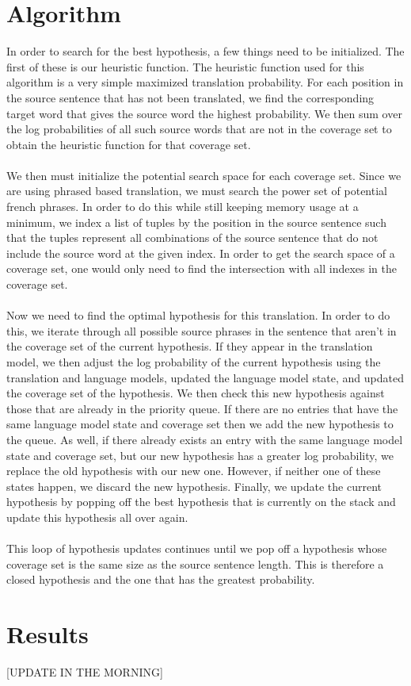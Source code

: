 \documentclass[11pt]{article}
\begin{document}
\section{Algorithm}
In order to search for the best hypothesis, a few things need to be initialized. The first of these is our heuristic function. The heuristic function used for this algorithm is a very simple maximized translation probability. For each position in the source sentence that has not been translated, we find the corresponding target word that gives the source word the highest probability. We then sum over the log probabilities of all such source words that are not in the coverage set to obtain the heuristic function for that coverage set.   \\\\
We then must initialize the potential search space for each coverage set. Since we are using phrased based translation, we must search the power set of potential french phrases. In order to do this while still keeping memory usage at a minimum, we index a list of tuples by the position in the source sentence such that the tuples represent all combinations of the source sentence that do not include the source word at the given index. In order to get the search space of a coverage set, one would only need to find the intersection with all indexes in the coverage set.\\\\
Now we need to find the optimal hypothesis for this translation. In order to do this, we iterate through all possible source phrases in the sentence that aren't in the coverage set of the current hypothesis. If they appear in the translation model, we then adjust the log probability of the current hypothesis using the translation and language models, updated the language model state, and updated the coverage set of the hypothesis. We then check this new hypothesis against those that are already in the priority queue. If there are no entries that have the same language model state and coverage set then we add the new hypothesis to the queue. As well, if there already exists an entry with the same language model state and coverage set, but our new hypothesis has a greater log probability, we replace the old hypothesis with our new one. However, if neither one of these states happen, we discard the new hypothesis. Finally, we update the current hypothesis by popping off the best hypothesis that is currently on the stack and update this hypothesis all over again. \\\\
This loop of hypothesis updates continues until we pop off a hypothesis whose coverage set is the same size as the source sentence length. This is therefore a closed hypothesis and the one that has the greatest probability.
\section{Results}
[UPDATE IN THE MORNING]
\end{document}
